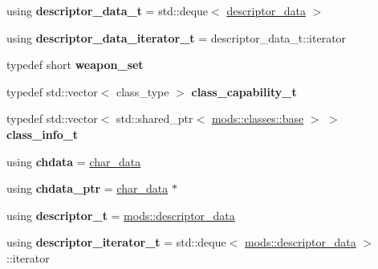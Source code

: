 \begin{DoxyCompactItemize}
using {\bfseries descriptor\+\_\+data\+\_\+t} = std\+::deque$<$ \hyperlink{structmods_1_1descriptor__data}{descriptor\+\_\+data} $>$
\item 
\mbox{\label{classmods_1_1player_a7435f35fe5d165ed38c73ab60c1bd73f}} 
using {\bfseries descriptor\+\_\+data\+\_\+iterator\+\_\+t} = descriptor\+\_\+data\+\_\+t\+::iterator
\item 
\mbox{\label{classmods_1_1player_aa74e447de4ad181448c3ff7b27f32bf9}} 
typedef short {\bfseries weapon\+\_\+set}
\item 
\mbox{\label{classmods_1_1player_ac4a894010346de83c2262262c7bfd878}} 
typedef std\+::vector$<$ class\+\_\+type $>$ {\bfseries class\+\_\+capability\+\_\+t}
\item 
\mbox{\label{classmods_1_1player_a79c2b6ef44dffb626eb41c03afbd9726}} 
typedef std\+::vector$<$ std\+::shared\+\_\+ptr$<$ \hyperlink{structmods_1_1classes_1_1base}{mods\+::classes\+::base} $>$ $>$ {\bfseries class\+\_\+info\+\_\+t}
\item 
\mbox{\label{classmods_1_1player_a5d6182011d6c71b86d305cbbf2ad5a82}} 
using {\bfseries chdata} = \hyperlink{structchar__data}{char\+\_\+data}
\item 
\mbox{\label{classmods_1_1player_a139f30733177426d3947a28348353854}} 
using {\bfseries chdata\+\_\+ptr} = \hyperlink{structchar__data}{char\+\_\+data} $\ast$
\item 
\mbox{\label{classmods_1_1player_aa511c83b7a662ce372ac9cfc1474408b}} 
using {\bfseries descriptor\+\_\+t} = \hyperlink{structmods_1_1descriptor__data}{mods\+::descriptor\+\_\+data}
\item 
\mbox{\label{classmods_1_1player_afd13fc7776eb3cfd97113e5e5e67f4c2}} 
using {\bfseries descriptor\+\_\+iterator\+\_\+t} = std\+::deque$<$ \hyperlink{structmods_1_1descriptor__data}{mods\+::descriptor\+\_\+data} $>$\+::iterator
\item 
\mbox{\label{classmods_1_1player_adeef9857b23167853dbd20e7ac016203}} 

\end{DoxyCompactItemize}
